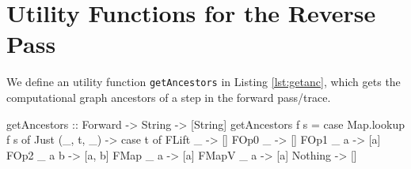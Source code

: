 \section{Utility Functions for the Reverse Pass} \label{app:utility}
    We define an utility function \texttt{getAncestors} in Listing \ref{lst:getanc}, which gets the computational graph ancestors of a step in the forward pass/trace.

    \begin{haskell}[caption=Function to get ancestors from a node in the trace, label=lst:getanc, gobble=8]
        getAncestors :: Forward -> String -> [String]
        getAncestors f s = case Map.lookup f s of
            Just (_, t, _) -> case t of
                FLift _     -> []
                FOp0  _     -> []
                FOp1  _ a   -> [a]
                FOp2  _ a b -> [a, b]
                FMap  _ a   -> [a]
                FMapV _ a   -> [a]
            Nothing        -> []
    \end{haskell}